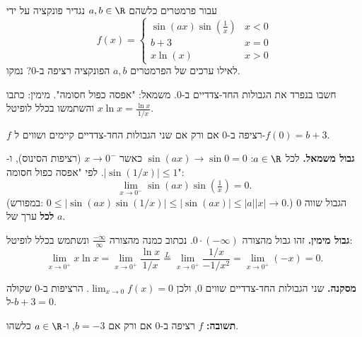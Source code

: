 
\begin{question}
עבור פרמטרים כלשהם $a,b\in\R$ נגדיר פונקציה על ידי
\[ f(x)=\begin{cases} \sin(ax)\sin(\frac{1}{x}) & x<0\\ b+3 & x=0\\ x\ln(x) & x>0 \end{cases} \]
לאילו ערכים של הפרמטרים $a,b$ הפונקציה רציפה ב-$0$? נמקו.
\end{question}

\begin{hint}
חשבו בנפרד את הגבולות החד-צדדיים ב-$0$. משמאל: "אפסה כפול חסומה". מימין: כתבו $x\ln x=\frac{\ln x}{1/x}$ והשתמשו בכלל לופיטל.
\end{hint}

\begin{solution}
$f$ רציפה ב-$0$ אם ורק אם שני הגבולות החד-צדדיים קיימים ושווים ל-$f(0)=b+3$.

\textbf{גבול משמאל.} לכל $a\in\R$: $\sin(ax)\to\sin0=0$ כאשר $x\to0^-$ (רציפות הסינוס), ו-$|\sin(1/x)|\le1$. לפי "אפסה כפול חסומה":
\[ \lim_{x\to0^-}\sin(ax)\sin\left(\tfrac1x\right)=0. \]
(במפורש: $0\le|\sin(ax)\sin(1/x)|\le|\sin(ax)|\le|a||x|\to0$.) הגבול שווה $0$ \textbf{לכל} ערך של $a$.

\textbf{גבול מימין.} זהו גבול מהצורה $0\cdot(-\infty)$. נכתוב כמנה מהצורה $\frac{-\infty}{\infty}$ ונשתמש בכלל לופיטל:
\[ \lim_{x\to0^+}x\ln x=\lim_{x\to0^+}\frac{\ln x}{1/x}\overset{L}{=}\lim_{x\to0^+}\frac{1/x}{-1/x^2}=\lim_{x\to0^+}(-x)=0. \]

\textbf{מסקנה.} שני הגבולות החד-צדדיים שווים $0$, ולכן $\lim_{x\to0}f(x)=0$. הרציפות ב-$0$ שקולה ל-$b+3=0$.

\textbf{תשובה:} $f$ רציפה ב-$0$ אם ורק אם $\boxed{b=-3}$, ו-$a\in\R$ כלשהו.
\end{solution}
